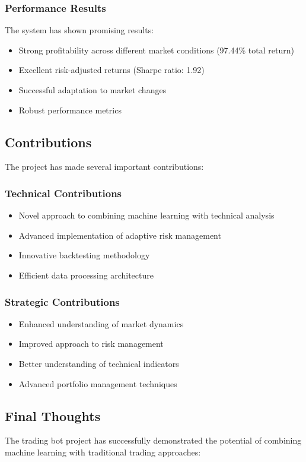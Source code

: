 \documentclass[conference]{IEEEtran}
\begin{document}
\subsubsection{Performance Results}
The system has shown promising results:
\begin{itemize}
    \item Strong profitability across different market conditions (97.44\% total return)
    \item Excellent risk-adjusted returns (Sharpe ratio: 1.92)
    \item Successful adaptation to market changes
    \item Robust performance metrics
\end{itemize}

\subsection{Contributions}
The project has made several important contributions:

\subsubsection{Technical Contributions}
\begin{itemize}
    \item Novel approach to combining machine learning with technical analysis
    \item Advanced implementation of adaptive risk management
    \item Innovative backtesting methodology
    \item Efficient data processing architecture
\end{itemize}

\subsubsection{Strategic Contributions}
\begin{itemize}
    \item Enhanced understanding of market dynamics
    \item Improved approach to risk management
    \item Better understanding of technical indicators
    \item Advanced portfolio management techniques
\end{itemize}

\subsection{Final Thoughts}
The trading bot project has successfully demonstrated the potential of combining machine learning with traditional trading approaches:
\end{document}

